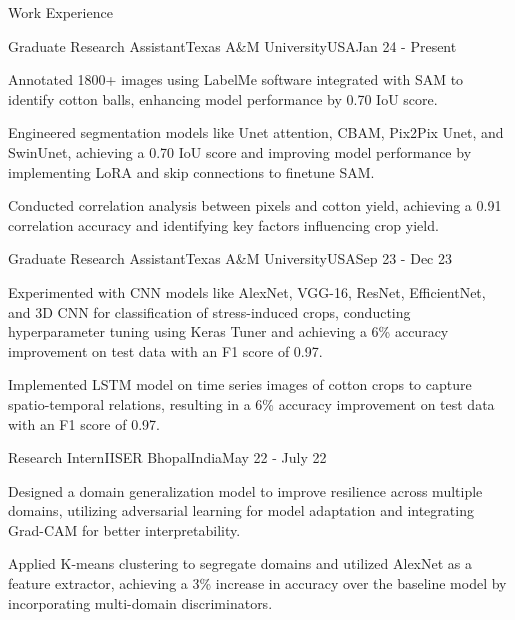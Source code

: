 \documentclass{resume}
\begin{document}
\begin{rSection}{Work Experience}
\vspace{-3pt}

\begin{rSubsectionWork}{Graduate Research Assistant}{Texas A\&M University}{USA}{Jan 24 - Present}

\vspace{-3pt}
\item Annotated 1800+ images using LabelMe software integrated with SAM to identify cotton balls, enhancing model performance by 0.70 IoU score.
\vspace{-3pt}
\item Engineered segmentation models like Unet attention, CBAM, Pix2Pix Unet, and SwinUnet, achieving a 0.70 IoU score and improving model performance by implementing LoRA and skip connections to finetune SAM.
\vspace{-3pt}
\item Conducted correlation analysis between pixels and cotton yield, achieving a 0.91 correlation accuracy and identifying key factors influencing crop yield.
\end{rSubsectionWork}
\vspace{-3pt}

\begin{rSubsectionWork}{Graduate Research Assistant}{Texas A\&M University}{USA}{Sep 23 - Dec 23}

\vspace{-3pt}
\item Experimented with CNN models like AlexNet, VGG-16, ResNet, EfficientNet, and 3D CNN for classification of stress-induced crops, conducting hyperparameter tuning using Keras Tuner and achieving a 6\% accuracy improvement on test data with an F1 score of 0.97.
\vspace{-3pt}
\item Implemented LSTM model on time series images of cotton crops to capture spatio-temporal relations, resulting in a 6\% accuracy improvement on test data with an F1 score of 0.97.
\end{rSubsectionWork}
\vspace{-3pt}

\begin{rSubsectionWork}{Research Intern}{IISER Bhopal}{India}{May 22 - July 22}

\vspace{-3pt}
\item Designed a domain generalization model to improve resilience across multiple domains, utilizing adversarial learning for model adaptation and integrating Grad-CAM for better interpretability.
\vspace{-3pt}
\item Applied K-means clustering to segregate domains and utilized AlexNet as a feature extractor, achieving a 3\% increase in accuracy over the baseline model by incorporating multi-domain discriminators.
\end{rSubsectionWork}
\vspace{-3pt}


\end{rSection}
\end{document}
